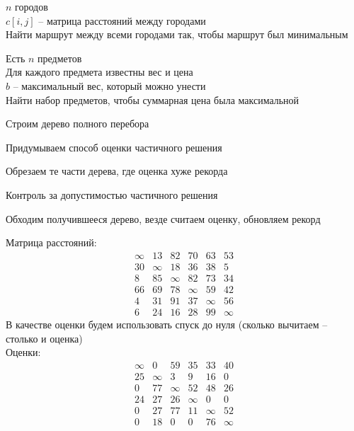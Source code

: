 \begin{problem}[коммивояжёра]
	$ n $ городов \\
    $ c[i, j] $ -- матрица расстояний между городами \\
    Найти маршрут между всеми городами так, чтобы маршрут был минимальным
\end{problem}

\begin{problem}[о рюкзаке]
	Есть $ n $ предметов \\
    Для каждого предмета известны вес и цена \\
    $ b $ -- максимальный вес, который можно унести \\
    Найти набор предметов, чтобы суммарная цена была максимальной
\end{problem}

\begin{algo}[B\&B]
    \item Строим дерево полного перебора
    \item Придумываем способ оценки частичного решения
    \item Обрезаем те части дерева, где оценка хуже рекорда
    \item Контроль за допустимостью частичного решения
    \item Обходим получившееся дерево, везде считаем оценку, обновляем рекорд
\end{algo}

\begin{eg}
	Матрица расстояний:
    $$
    \begin{matrix}
    	\infty & 13 & 82 & 70 & 63 & 53 \\
        30 & \infty & 18 & 36 & 38 & 5 \\
        8 & 85 & \infty & 82 & 73 & 34 \\
        66 & 69 & 78 & \infty & 59 & 42 \\
        4 & 31 & 91 & 37 & \infty & 56 \\
        6 & 24 & 16 & 28 & 99 & \infty
    \end{matrix} $$
    В качестве оценки будем использовать спуск до нуля (сколько вычитаем -- столько и оценка) \\
    Оценки:
    $$
    \begin{matrix}
    	\infty & 0 & 59 & 35 & 33 & 40 \\
        25 & \infty & 3 & 9 & 16 & 0 \\
        0 & 77 & \infty & 52 & 48 & 26 \\
        24 & 27 & 26 & \infty & 0 & 0 \\
        0 & 27 & 77 & 11 & \infty & 52 \\
        0 & 18 & 0 & 0 & 76 & \infty
    \end{matrix} $$
\end{eg}
